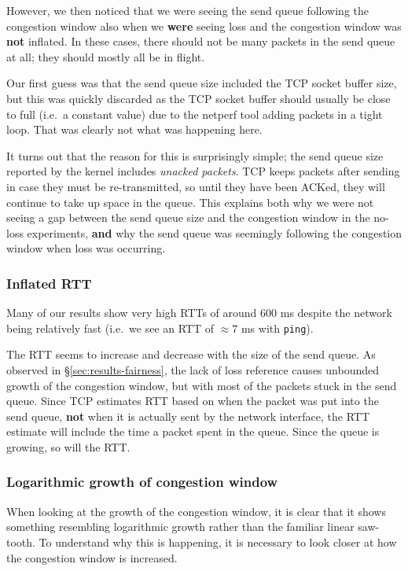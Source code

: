 However, we then noticed that we were seeing the send queue following the
congestion window also when we \textbf{were} seeing loss and the congestion
window was \textbf{not} inflated. In these cases, there should not be many
packets in the send queue at all; they should mostly all be in flight.

Our first guess was that the send queue size included the TCP socket buffer
size, but this was quickly discarded as the TCP socket buffer should usually be
close to full (i.e.\ a constant value) due to the netperf tool adding packets in
a tight loop. That was clearly not what was happening here.

It turns out that the reason for this is surprisingly simple; the send queue
size reported by the kernel includes \textit{unacked packets}. TCP keeps packets
after sending in case they must be re-transmitted, so until they have been
ACKed, they will continue to take up space in the queue. This explains both why
we were not seeing a gap between the send queue size and the congestion window
in the no-loss experiments, \textbf{and} why the send queue was seemingly
following the congestion window when loss was occurring.

\subsubsection{Inflated RTT}
Many of our results show very high RTTs of around 600 ms despite the network
being relatively fast (i.e.\ we see an RTT of $\approx 7$ ms with
\texttt{ping}). 

The RTT seems to increase and decrease with the size of the send queue. As 
observed in \S\ref{sec:results-fairness}, the lack of loss reference causes 
unbounded growth of the congestion window, but with most of the packets stuck in 
the send queue. Since TCP estimates RTT based on when the packet was put into 
the send queue, \textbf{not} when it is actually sent by the network interface, 
the RTT estimate will include the time a packet spent in the queue. Since the 
queue is growing, so will the RTT.

\subsubsection{Logarithmic growth of congestion window}
When looking at the growth of the congestion window, it is clear that it shows
something resembling logarithmic growth rather than the familiar linear
saw-tooth. To understand why this is happening, it is necessary to look closer
at how the congestion window is increased.

